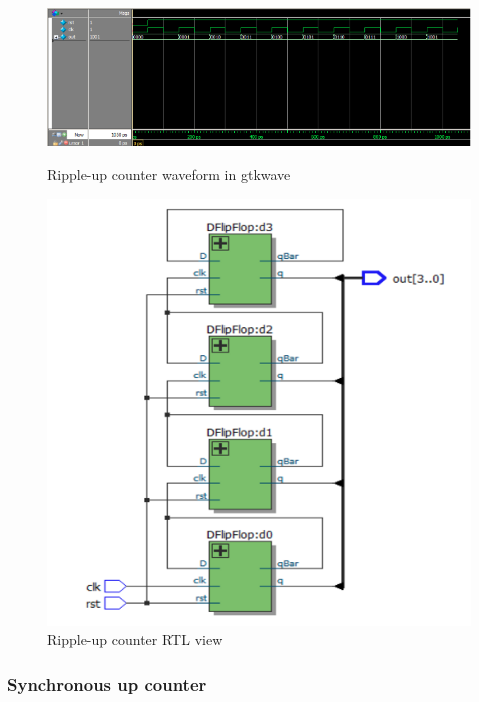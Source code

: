 \documentclass{article}
\begin{document}
\begin{figure}
  \centering
	\includegraphics[width=\linewidth]{figures/waveforms/rippleUp_wave.png}
	\caption{Ripple-up counter waveform in gtkwave}
	\label{fig:rippleUp_waveform}

	\includegraphics[width=0.75\linewidth]{figures/RTLs/rippleUp_RTL.png}
	\caption{Ripple-up counter RTL view}
	\label{fig:rippleUp_RTL}
\end{figure}
\newpage

\subsubsection{Synchronous up counter}


\newpage
\end{document}
